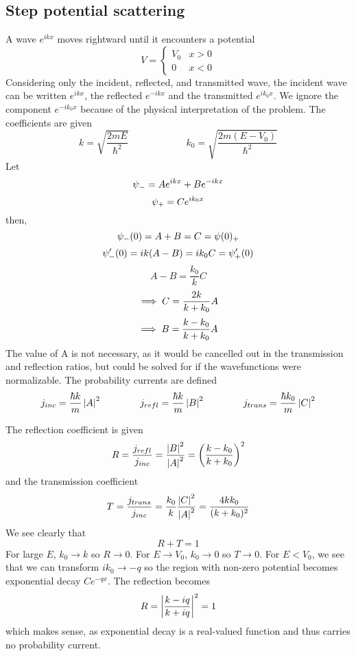 \subsection{Step potential scattering}
A wave \(e^{ikx}\) moves rightward until it encounters a potential
\[V = \begin{cases}
	V_0 & x>0\\
	0 & x< 0
\end{cases}\]
Considering only the incident, reflected, and transmitted wave, the incident wave can be written \(e^{ikx}\), the reflected \(e^{-ikx}\) and the transmitted \(e^{ik_0x}\). We ignore the component \(e^{-ik_0 x}\) because of the physical interpretation of the problem.
The coefficients are given
\[k = \sqrt{\frac{2mE}{\hbar^2}} \qquad \qquad \qquad k_0 = \sqrt{\frac{2m(E-V_0)}{\hbar^2}}\]
Let
\[\psi_- = Ae^{ikx}+Be^{-ikx}\]
\[\psi_+ = Ce^{ik_0x}\]
then,
\[\psi_-(0)=A+B=C=\psi(0)_+\]
\[\psi'_-(0)=ik(A-B)=ik_0C=\psi'_+(0)\]
\[A-B=\frac{k_0}{k}C\]
\[\implies C=\frac{2k}{k+k_0}A\]
\[\implies B=\frac{k-k_0}{k+k_0}A\]
The value of A is not necessary, as it would be cancelled out in the transmission and reflection ratios, but could be solved for if the wavefunctions were normalizable. The probability currents are defined
\[j_{inc}=\frac{\hbar k}{m}\left|A\right|^2 \qquad \qquad j_{refl}=\frac{\hbar k}{m}\left|B\right|^2 \qquad \qquad j_{trans}=\frac{\hbar k_0}{m}\left|C\right|^2\]

The reflection coefficient is given
\begin{equation}
	R = \frac{j_{refl}}{j_{inc}}=\frac{\left|B\right|^2}{\left|A\right|^2}=\left(\frac{k-k_0}{k+k_0}\right)^2
\end{equation}
and the transmission coefficient
\begin{equation}
	T = \frac{j_{trans}}{j_{inc}}= \frac{k_0}{k}\frac{\left|C\right|^2}{\left|A\right|^2}=\frac{4kk_0}{(k+k_0)^2}
\end{equation}
We see clearly that
\begin{equation}
	R+T=1
\end{equation}
For large \(E\), \(k_0\to k\) so \(R\to 0\). For \(E\to V_0\), \(k_0\to 0\) so \(T\to 0\).
For \(E<V_0\), we see that we can transform \(ik_0\to -q\) so the region with non-zero potential becomes exponential decay \(Ce^{-qx}\). The reflection becomes
\begin{equation}
	R = \left|\frac{k-iq}{k+iq}\right|^2=1
\end{equation}
which makes sense, as exponential decay is a real-valued function and thus carries no probability current.

